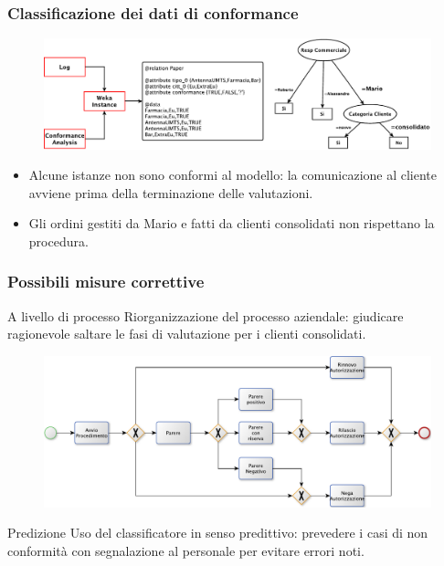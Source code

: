
\begin{frame}
	\frametitle{Classificazione dei dati di conformance}
	\begin{figure}
	\includegraphics[scale=0.6]{./fig/decisiontree1}
	\end{figure}
	\begin{block}{}
	\begin{itemize}
	\item Alcune istanze non sono conformi al modello: la comunicazione al cliente avviene prima della terminazione delle valutazioni.
	\item Gli ordini gestiti da Mario e fatti da clienti consolidati non rispettano la procedura.
	\end{itemize}
	\end{block}
	\end{frame}
	
	\begin{frame}
	\frametitle{Possibili misure correttive}
	\begin{block}{A livello di processo}
	Riorganizzazione del processo aziendale: giudicare ragionevole saltare le fasi di valutazione per i clienti consolidati.
	\end{block}
	\begin{figure}
	\includegraphics[scale=0.4]{./fig/BPMN}
	\end{figure}
	\begin{block}{Predizione}
	Uso del classificatore in senso predittivo: prevedere i casi di non conformit\`{a} con segnalazione al personale per evitare errori noti.  
	\end{block}
	\end{frame}
	